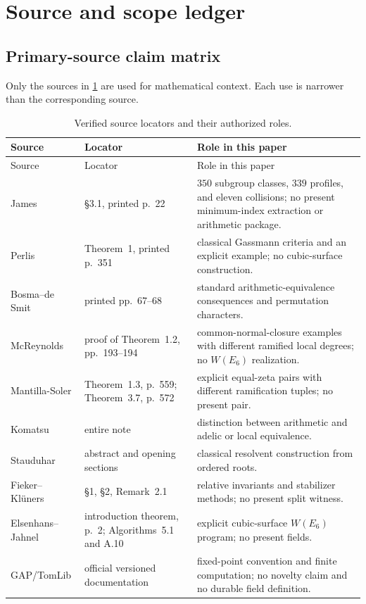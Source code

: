 \section{Source and scope ledger}
\label{app:source-scope}

\subsection{Primary-source claim matrix}

Only the sources in \cref{tab:source-matrix} are used for mathematical
context.  Each use is narrower than the corresponding source.

\begin{longtable}{@{}
  >{\raggedright\arraybackslash}p{}
  >{\raggedright\arraybackslash}p{}
  >{\raggedright\arraybackslash}p{}@{}}
\caption{Verified source locators and their authorized roles.}
\label{tab:source-matrix}\\
\toprule
Source & Locator & Role in this paper\\
\midrule
\endfirsthead
\toprule
Source & Locator & Role in this paper\\
\midrule
\endhead
James \citep{james2022bayesian} & \S3.1, printed p.~22 &
$350$ subgroup classes, $339$ profiles, and eleven collisions; no present
minimum-index extraction or arithmetic package.\\
Perlis \citep{perlis1977equation} & Theorem~1, printed p.~351 &
classical Gassmann criteria and an explicit example; no cubic-surface
construction.\\
Bosma--de Smit \citep{bosmadesmit2002small} & printed pp.~67--68 &
standard arithmetic-equivalence consequences and permutation characters.\\
McReynolds \citep{mcreynolds2015spectra} & proof of Theorem~1.2,
pp.~193--194 & common-normal-closure examples with different ramified local
degrees; no $W(E_6)$ realization.\\
Mantilla-Soler \citep{mantillasoler2019question} & Theorem~1.3, p.~559;
Theorem~3.7, p.~572 & explicit equal-zeta pairs with different ramification
tuples; no present pair.\\
Komatsu \citep{komatsu1984adele} & entire note & distinction between
arithmetic and adelic or local equivalence.\\
Stauduhar \citep{stauduhar1973determination} & abstract and opening sections &
classical resolvent construction from ordered roots.\\
Fieker--Kl\"uners \citep{fiekerklueners2014computation} & \S1, \S2,
Remark~2.1 & relative invariants and stabilizer methods; no present split
witness.\\
Elsenhans--Jahnel \citep{elsenhansjahnel2015moduli} & introduction theorem,
p.~2; Algorithms~5.1 and A.10 & explicit cubic-surface $W(E_6)$ program;
no present fields.\\
GAP/TomLib \citep{gap2021,tomlib2019} & official versioned documentation &
fixed-point convention and finite computation; no novelty claim and no
durable field definition.\\
\bottomrule
\end{longtable}

